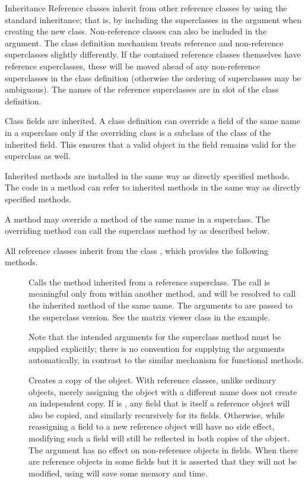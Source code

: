 \begin{Section}{Inheritance}
Reference classes inherit from other reference classes by using the
standard \R{} inheritance; that is, by including the superclasses in the
 argument when creating the new class.
Non-reference classes can also be included in the  argument.  The class definition
mechanism treats reference and non-reference superclasses slightly differently.
If the contained reference classes themselves have reference
superclasses, these will be moved ahead of any non-reference
superclasses in the class definition (otherwise the ordering of
superclasses may be ambiguous).
The names of the reference superclasses are in slot
 of the class definition.

Class fields are inherited.  A class definition can override a field
of the same name in a superclass only if the overriding class is a
subclass of the class of the inherited field.  This ensures that a
valid object in the field remains valid for the superclass as well.

Inherited methods are installed in the same way as directly
specified methods.
The code in a method can refer to  inherited methods in the same
way as directly specified methods.

A method may override a method of the same name in a superclass.
The overriding method can call the superclass method by
 as described below.

All reference classes inherit from the class ,
which provides the following methods.

\begin{description}

\item[]  
Calls the method inherited from a reference superclass.
The call is meaningful only from within another method, and will be
resolved to call the inherited method of the same name.
The arguments to  
are passed to the superclass version.
See the matrix viewer class in the example.

Note that the intended arguments for the superclass method must be
supplied explicitly; there is no convention for supplying the
arguments automatically, in contrast to the similar mechanism for
functional methods.


\item[]  
Creates a copy of the object.  With reference classes, unlike ordinary
\R{} objects, merely assigning the object with a different name does not
create an independent copy.  If  is , any
field that is itself a reference object will also be copied, and
similarly recursively for its fields.  Otherwise, while reassigning a
field to a new reference object will have no side effect, modifying
such a field will still be reflected in both copies of the object.
The argument has no effect on non-reference objects in fields.  When
there are reference objects in some fields but it is asserted that
they will not be modified, using  will save some
memory and time.



\end{description}
\end{Section}
